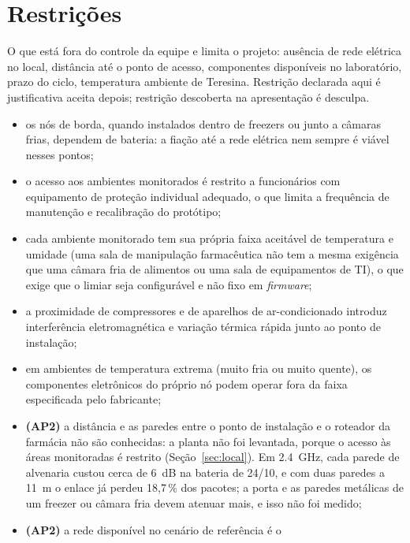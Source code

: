 \section{Restrições}

\begin{orientacao}
O que está fora do controle da equipe e limita o projeto: ausência de
rede elétrica no local, distância até o ponto de acesso, componentes
disponíveis no laboratório, prazo do ciclo, temperatura ambiente de
Teresina. Restrição declarada aqui é justificativa aceita depois;
restrição descoberta na apresentação é desculpa.
\end{orientacao}

\begin{itemize}
  \item os nós de borda, quando instalados dentro de freezers ou junto a
    câmaras frias, dependem de bateria: a fiação até a rede elétrica
    nem sempre é viável nesses pontos;
  \item o acesso aos ambientes monitorados é restrito a funcionários com
    equipamento de proteção individual adequado, o que limita a
    frequência de manutenção e recalibração do protótipo;
  \item cada ambiente monitorado tem sua própria faixa aceitável de
    temperatura e umidade (uma sala de manipulação farmacêutica não
    tem a mesma exigência que uma câmara fria de alimentos ou uma sala
    de equipamentos de TI), o que exige que o limiar seja configurável
    e não fixo em \emph{firmware};
  \item a proximidade de compressores e de aparelhos de ar-condicionado
    introduz interferência eletromagnética e variação térmica rápida
    junto ao ponto de instalação;
  \item em ambientes de temperatura extrema (muito fria ou muito
    quente), os componentes eletrônicos do próprio nó podem operar fora
    da faixa especificada pelo fabricante;
  \item \textbf{(AP2)} a distância e as paredes entre o ponto de
    instalação e o roteador da farmácia não são conhecidas: a planta não
    foi levantada, porque o acesso às áreas monitoradas é restrito
    (Seção~\ref{sec:local}). Em \SI{2,4}{\giga\hertz}, cada parede de
    alvenaria custou cerca de \SI{6}{\deci\bel} na bateria de 24/10, e com
    duas paredes a \SI{11}{\metre} o enlace já perdeu 18,7\,\% dos
    pacotes; a porta e as paredes metálicas de um freezer ou câmara fria
    devem atenuar mais, e isso não foi medido;
  \item \textbf{(AP2)} a rede disponível no cenário de referência é o

\end{itemize}
